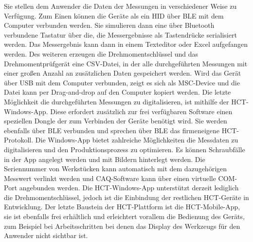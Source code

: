 Sie stellen dem Anwender die Daten der Messungen in verschiedener Weise zu Verfügung. Zum Einen können die Geräte als ein \ac{HID} über \ac{BLE} mit dem Computer verbunden werden. Sie simulieren dann eine über Bluetooth verbundene Tastatur über die, die Messergebnisse als Tastendrücke serialisiert werden. Das Messergebnis kann dann in einem Texteditor oder Excel aufgefangen werden. Des weiteren erzeugen die Drehmomentschlüssel und das Drehmomentprüfgerät eine \ac{CSV}-Datei, in der alle durchgeführten Messungen mit einer großen Anzahl an zusätzlichen Daten gespeichert werden. Wird das Gerät über \ac{USB} mit dem Computer verbunden, zeigt es sich als \ac{MSC}-Device und die Datei kann per Drag-and-drop auf den Computer kopiert werden. Die letzte Möglichkeit die durchgeführten Messungen zu digitalisieren, ist mithilfe der \ac{HCT}-Windows-App. Diese erfordert zusätzlich zur frei verfügbaren Software einen speziellen Dongle der zum Verbinden der Geräte benötigt wird. Sie werden ebenfalls über \ac{BLE} verbunden und sprechen über \ac{BLE} das firmeneigene \ac{HCT}-Protokoll. Die Windows-App bietet zahlreiche Möglichkeiten die Messdaten zu digitalisieren und den Produktionsprozess zu optimieren. Es können Schraubfälle in der App angelegt werden und mit Bildern hinterlegt werden. Die Seriennummer von Werkstücken kann automatisch mit dem dazugehörigen Messwert verlinkt werden und \ac{CAQ}-Software kann über einen virtuelle COM-Port angebunden werden. Die \ac{HCT}-Windows-App unterstützt derzeit lediglich die Drehmomentschlüssel, jedoch ist die Einbindung der restlichen \ac{HCT}-Geräte in Entwicklung. Der letzte Baustein der \ac{HCT}-Plattform ist die \ac{HCT}-Mobile-App, sie ist ebenfalls frei erhältlich und erleichtert vorallem die Bedienung des Geräts, zum Beispiel bei Arbeitsschritten bei denen das Display des Werkzeugs für den Anwender nicht sichtbar ist.

